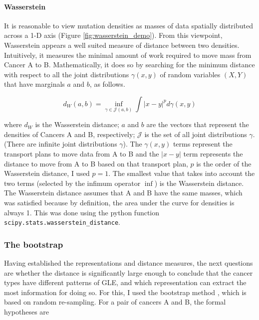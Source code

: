 \paragraph{Wasserstein} It is reasonable to view mutation densities as masses of data spatially distributed across a 1-D axis (Figure \ref{fig:wasserstein_demo}). From this viewpoint, Wasserstein appears a well suited measure of distance between two densities. Intuitively, it measures the minimal amount of work required to move mass from Cancer A to B. Mathematically, it does so by searching for the minimum distance with respect to all the joint distributions $\gamma(x,y)$ of random variables $(X,Y)$ that have \glspl{marginal} $a$ and $b$, as follows.

\begin{equation}
    d_W(a,b) = \underset{\gamma \in \mathcal{J}(a,b)}{\inf} \int |x-y|^p d \gamma(x,y) 
    \label{eq:wassertein}
\end{equation}

where $d_W$ is the Wasserstein distance; $a$ and $b$ are the vectors that represent the densities of Cancers A and B, respectively; $\mathcal{J}$ is the set of all joint distributions $\gamma$. (There are infinite joint distributions $\gamma$). The $\gamma(x,y)$ terms represent the transport plans to move data from A to B and the $|x-y|$ term represents the distance to move from A to B based on that transport plan, $p$ is the order of the Wasserstein distance, I used $p=1$. The smallest value that takes into account the two terms (selected by the infimum operator $\inf$) is the Wasserstein distance. The Wasserstein distance assumes that A and B have the same masses, which was satisfied because by definition, the area under the curve for densities is always 1. This was done using the python function \texttt{scipy.stats.wasserstein\_distance}.



\subsubsection{The bootstrap}

Having established the representations and distance measures, the next questions are whether the distance is significantly large enough to conclude that the cancer types have different patterns of GLE, and which representation can extract the most information for doing so. For this, I used the bootstrap method \citep{Singh2010BootstrapMethod}, which is based on random re-sampling. For a pair of cancers A and B, the formal hypotheses are

